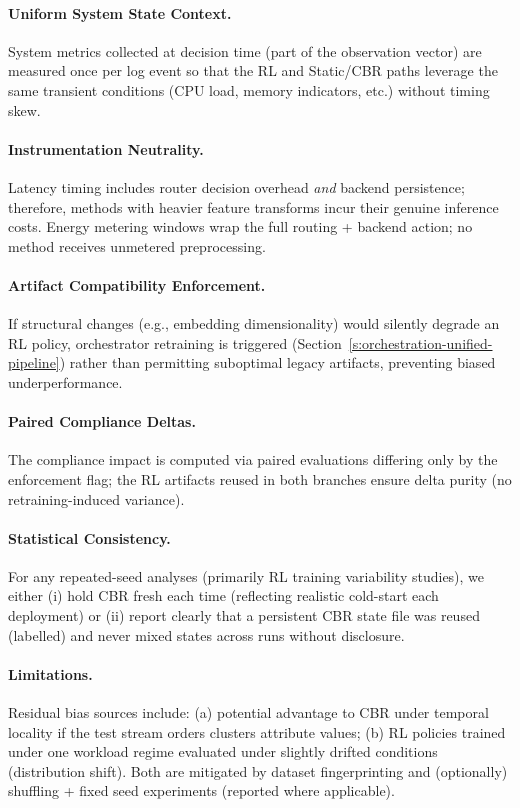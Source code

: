 \paragraph{Uniform System State Context.}
System metrics collected at decision time (part of the observation vector) are measured once per log event so that the RL and Static/CBR paths leverage the same transient conditions (CPU load, memory indicators, etc.) without timing skew.

\paragraph{Instrumentation Neutrality.}
Latency timing includes router decision overhead \emph{and} backend persistence; therefore, methods with heavier feature transforms incur their genuine inference costs. Energy metering windows wrap the full routing + backend action; no method receives unmetered preprocessing.

\paragraph{Artifact Compatibility Enforcement.}
If structural changes (e.g., embedding dimensionality) would silently degrade an RL policy, orchestrator retraining is triggered (Section~\ref{s:orchestration-unified-pipeline}) rather than permitting suboptimal legacy artifacts, preventing biased underperformance.

\paragraph{Paired Compliance Deltas.}
The compliance impact is computed via paired evaluations differing only by the enforcement flag; the RL artifacts reused in both branches ensure delta purity (no retraining-induced variance).

\paragraph{Statistical Consistency.}
For any repeated-seed analyses (primarily RL training variability studies), we either (i) hold CBR fresh each time (reflecting realistic cold-start each deployment) or (ii) report clearly that a persistent CBR state file was reused (labelled) and never mixed states across runs without disclosure.

\paragraph{Limitations.}
Residual bias sources include: (a) potential advantage to CBR under temporal locality if the test stream orders clusters attribute values; (b) RL policies trained under one workload regime evaluated under slightly drifted conditions (distribution shift). Both are mitigated by dataset fingerprinting and (optionally) shuffling + fixed seed experiments (reported where applicable).

